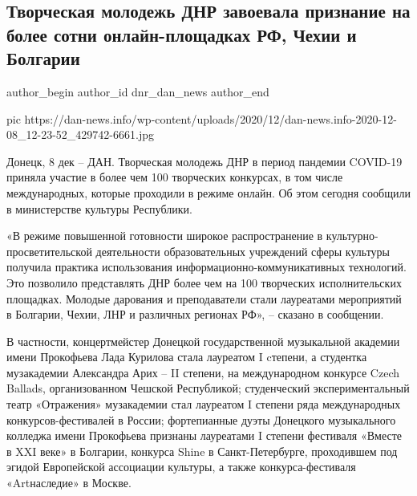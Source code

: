  
 
 
 
 
 
\subsection{Творческая молодежь ДНР завоевала признание на более сотни онлайн-площадках РФ, Чехии и Болгарии}
\label{sec:08_12_2020.news.dnr.dan.dnr_dan_news.1.tvorcheskaja_molodezh_dnr}
\ifcmt
	author_begin
   author_id dnr_dan_news
	author_end
\fi

\ifcmt
pic https://dan-news.info/wp-content/uploads/2020/12/dan-news.info-2020-12-08_12-23-52_429742-6661.jpg
\fi

Донецк, 8 дек – ДАН. Творческая молодежь ДНР в период пандемии COVID-19 приняла
участие в более чем 100 творческих конкурсах, в том числе международных,
которые проходили в режиме онлайн. Об этом сегодня сообщили в министерстве
культуры Республики.

«В режиме повышенной готовности широкое распространение в
культурно-просветительской деятельности образовательных учреждений сферы
культуры получила практика использования информационно-коммуникативных
технологий. Это позволило представлять ДНР более чем на 100 творческих
исполнительских площадках. Молодые дарования и преподаватели стали лауреатами
мероприятий в Болгарии, Чехии, ЛНР и различных регионах РФ», – сказано в
сообщении.

В частности, концертмейстер Донецкой государственной музыкальной академии имени
Прокофьева Лада Курилова стала лауреатом I cтепени, а студентка музакадемии
Александра Арих – II степени, на международном конкурсе Czech Ballads,
организованном Чешской Республикой; студенческий экспериментальный театр
«Отражения» музакадемии стал лауреатом I степени ряда международных
конкурсов-фестивалей в России; фортепианные дуэты Донецкого музыкального
колледжа имени Прокофьева признаны лауреатами I степени фестиваля «Вместе в XXI
веке» в Болгарии, конкурса Shine в Санкт-Петербурге, проходившем под эгидой
Европейской ассоциации культуры, а также конкурса-фестиваля «Artнаследие» в
Москве.

